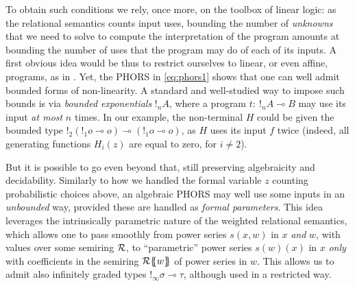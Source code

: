 To obtain such conditions we rely, once more, on the toolbox of linear logic: 
as the relational semantics counts input uses, 
bounding the number of \emph{unknowns} that we need to solve to compute the interpretation of the program amounts at bounding the number of uses that the program may do of each of its inputs.
A first obvious idea would be thus to restrict ourselves to linear, or even affine, programs, as in \cite{DBLP:conf/lics/LiMO22}. Yet, the PHORS in \eqref{eq:phors1} shows that one can well admit {bounded} forms of non-linearity. 
A standard and well-studied way to impose such bounds is via \emph{bounded  exponentials} \cite{GIRARD19921, 10.1007/978-3-642-02273-9_8, 10.1007/978-3-642-54833-8_19, 10.1007/978-3-642-54833-8_18} $!_nA$, where a program $t:\ !_nA\multimap B$ may use its input \emph{at most} $n$ times. 
In our example, the non-terminal $H$ could be given the bounded type $!_2(!_1o\multimap o)\multimap (!_1o\multimap o)$, as $H$ uses its input $f$ twice (indeed, all generating functions $H_i(z)$ are equal to zero, for $i\neq 2$).




But it is possible to go even beyond that, still preserving algebraicity and decidability.
Similarly to how we handled the formal variable $z$ counting probabilistic choices above, 
an algebraic PHORS may well use some inputs in an \emph{unbounded} way, provided these are handled as \emph{formal parameters}.
This idea leverages the intrinsically parametric nature of the weighted relational semantics, which allows one to pass smoothly from power series $s(x,w)$ in $x$ \emph{and} $w$, with values over some semiring $\mathcal{R}$, to ``parametric'' power series $s(w)(x)$ in $x$ \emph{only} with coefficients in the semiring ${\mathcal{R}}\{\!\!\{w\}\!\!\}$ of power series in $w$.
This allows us to admit also infinitely graded types $!_\infty\sigma\multimap \tau$, although used in a restricted way. 




